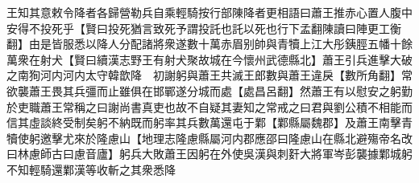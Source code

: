 王知其意敕令降者各歸營勒兵自乘輕騎按行部陳降者更相語曰蕭王推赤心置人腹中安得不投死乎【賢曰投死猶言致死予謂投託也託以死也行下孟翻陳讀曰陣更工衡翻】由是皆服悉以降人分配諸將衆遂數十萬赤眉别帥與青犢上江大彤銕脛五幡十餘萬衆在射犬【賢曰續漢志野王有射犬聚故城在今懷州武德縣北】蕭王引兵進擊大破之南狥河内河内太守韓歆降　初謝躬與蕭王共滅王郎數與蕭王違戾【數所角翻】常欲襲蕭王畏其兵彊而止雖俱在邯鄲遂分城而處【處昌呂翻】然蕭王有以慰安之躬勤於吏職蕭王常稱之曰謝尚書真吏也故不自疑其妻知之常戒之曰君與劉公積不相能而信其虛談終受制矣躬不納既而躬率其兵數萬還屯于鄴【鄴縣屬魏郡】及蕭王南擊青犢使躬邀擊尤來於隆慮山【地理志隆慮縣屬河内郡應邵曰隆慮山在縣北避殤帝名改曰林慮師古曰慮音廬】躬兵大敗蕭王因躬在外使吳漢與刺姧大將軍岑彭襲據鄴城躬不知輕騎還鄴漢等收斬之其衆悉降